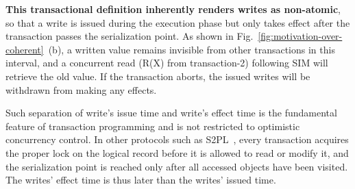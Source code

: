 
\textbf{This transactional definition inherently renders writes as non-atomic}, so that a write is issued during the execution phase but only takes effect after the transaction passes the serialization point. As shown in Fig.~\ref{fig:motivation-over-coherent}~(b), a written value remains invisible from other transactions in this interval, and a concurrent read (R(X) from transaction-2) following SIM will retrieve the old value. If the transaction aborts, the issued writes will be withdrawn from making any effects.

Such separation of write's issue time and write's effect time is the fundamental feature of transaction programming and is not restricted to optimistic concurrency control. In other protocols such as S2PL~\cite{mvcc_vldb17, s2pl_dataeng87, s2pl_csur81}, every transaction acquires the proper lock on the logical record before it is allowed to read or modify it, and the serialization point is reached only after all accessed objects have been visited. The writes' effect time is thus later than the writes' issued time. 





